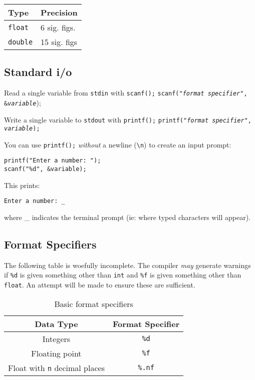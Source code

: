 \documentclass{lab}
\begin{document}
\begin{multicols}{2}
\begin{table}[H]
\begin{tabular}{|l|l|}
\hline
Type & Precision \\
\hline
\texttt{float} & 6 sig. figs. \\
\texttt{double} & 15 sig. figs \\
\hline
\end{tabular}
\end{table}


\subsection{Standard i/o}

Read a single variable from \texttt{stdin} with \texttt{scanf();}
\texttt{scanf("\textit{format specifier}", \&\textit{variable}});

Write a single variable to \texttt{stdout} with \texttt{printf();}
\texttt{printf("\textit{format specifier}", \textit{variable});}

You can use \texttt{printf();} \textit{without} a newline (\texttt{\textbackslash n}) to create an input prompt:

\begin{lstlisting}[style=CStyle]
printf("Enter a number: ");
scanf("%d", &variable);
\end{lstlisting}

This prints:

\texttt{Enter a number: \_}

where \_ indicates the terminal prompt (ie: where typed characters will appear).

\subsection{Format Specifiers}
The following table is woefully incomplete. The compiler \textit{may} generate warnings if \texttt{\%d} is given something other than \texttt{int} and \texttt{\%f} is given something other than \texttt{float}. An attempt will be made to ensure these are sufficient.
\begin{table}[H]
\centering
\begin{tabular}{|c|c|}
\hline
Data Type & Format Specifier \\
\hline
Integers & \texttt{\%d} \\
Floating point & \texttt{\%f} \\
Float with \texttt{n} decimal places & \texttt{\%.nf} \\
\hline
\end{tabular}
\caption{Basic format specifiers}
\end{table}


\end{multicols}
\end{document}
